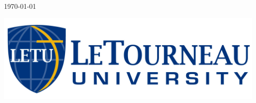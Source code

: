 \begin{titlepage}
{\Large \df\today}\\[2cm] %

\vfill %

\includegraphics[scale=0.20]{logoHoriz.jpg}\\[1cm] %
 

\end{titlepage}
